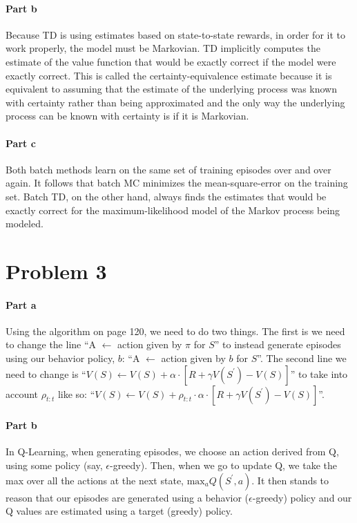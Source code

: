 \documentclass[12pt]{article}
\begin{document}
\paragraph{Part b}

Because TD is using estimates based on state-to-state rewards, in order for it to work properly, the model must be Markovian. TD implicitly computes the estimate of the value function that would be exactly correct if the
model were exactly correct. This is called the certainty-equivalence estimate because it is equivalent to assuming that the estimate of the underlying process was known with certainty rather than being approximated and the only way the underlying process can be known with certainty is if it is Markovian.

\paragraph{Part c}

Both batch methods learn on the same set of training episodes over and over again. It follows that batch MC minimizes the mean-square-error on the training set. Batch TD, on the other hand, always finds the estimates that would be exactly correct for the maximum-likelihood model of the Markov process being modeled.

\section{Problem 3}

\paragraph{Part a}

Using the algorithm on page 120, we need to do two things. The first is we need to change the line ``A $\gets$ action given by $\pi$ for $S$'' to instead generate episodes using our behavior policy, $b$: ``A $\gets$ action given by $b$ for $S$''. The second line we need to change is ``$V(S) \gets V(S) + \alpha \cdot [R + \gamma V(S^\prime) - V(S)]$'' to take into account $\rho_{t:t}$ like so: ``$V(S) \gets V(S) + \rho_{t:t} \cdot \alpha \cdot [R + \gamma V(S^\prime) - V(S)]$''.

\paragraph{Part b}

In Q-Learning, when generating episodes, we choose an action derived from Q, using some policy (say, $\epsilon$-greedy). Then, when we go to update Q, we take the max over all the actions at the next state, $\text{max}_a Q(S^\prime, a)$. It then stands to reason that our episodes are generated using a behavior ($\epsilon$-greedy) policy and our Q values are estimated using a target (greedy) policy.
\end{document}
